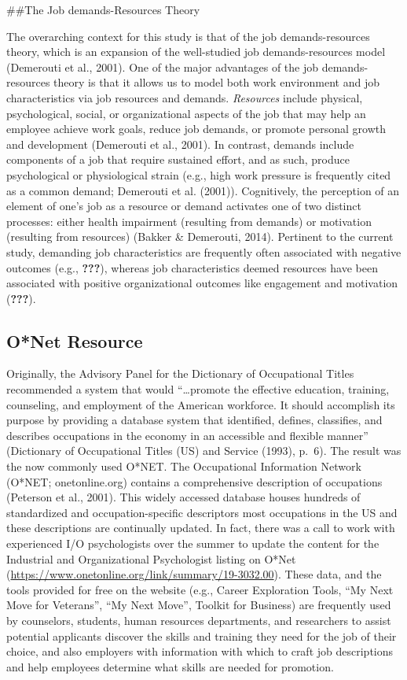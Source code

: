 \documentclass[
  english,
  man]{apa6}
\begin{document}
\#\#The Job demands-Resources Theory

The overarching context for this study is that of the job demands-resources theory, which is an expansion of the well-studied job demands-resources model (Demerouti et al., 2001). One of the major advantages of the job demands-resources theory is that it allows us to model both work environment and job characteristics via job resources and demands. \emph{Resources} include physical, psychological, social, or organizational aspects of the job that may help an employee achieve work goals, reduce job demands, or promote personal growth and development (Demerouti et al., 2001). In contrast, demands include components of a job that require sustained effort, and as such, produce psychological or physiological strain (e.g., high work pressure is frequently cited as a common demand; Demerouti et al. (2001)).
Cognitively, the perception of an element of one's job as a resource or demand activates one of two distinct processes: either health impairment (resulting from demands) or motivation (resulting from resources) (Bakker \& Demerouti, 2014). Pertinent to the current study, demanding job characteristics are frequently often associated with negative outcomes (e.g., {\textbf{???}}), whereas job characteristics deemed resources have been associated with positive organizational outcomes like engagement and motivation ({\textbf{???}}).

\hypertarget{onet-resource}{%
\subsection{O*Net Resource}\label{onet-resource}}

Originally, the Advisory Panel for the Dictionary of Occupational Titles recommended a system that would \enquote{\ldots promote the effective education, training, counseling, and employment of the American workforce. It should accomplish its purpose by providing a database system that identified, defines, classifies, and describes occupations in the economy in an accessible and flexible manner} (Dictionary of Occupational Titles (US) and Service (1993), p.~6). The result was the now commonly used O*NET. The Occupational Information Network (O*NET; onetonline.org) contains a comprehensive description of occupations (Peterson et al., 2001). This widely accessed database houses hundreds of standardized and occupation-specific descriptors most occupations in the US and these descriptions are continually updated. In fact, there was a call to work with experienced I/O psychologists over the summer to update the content for the Industrial and Organizational Psychologist listing on O*Net (\url{https://www.onetonline.org/link/summary/19-3032.00}). These data, and the tools provided for free on the website (e.g., Career Exploration Tools, \enquote{My Next Move for Veterans}, \enquote{My Next Move}, Toolkit for Business) are frequently used by counselors, students, human resources departments, and researchers to assist potential applicants discover the skills and training they need for the job of their choice, and also employers with information with which to craft job descriptions and help employees determine what skills are needed for promotion.
\end{document}
